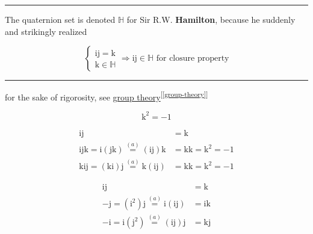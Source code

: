 \documentclass[
]{book}
\theoremstyle{definition}
\theoremstyle{definition}
\theoremstyle{definition}
\theoremstyle{definition}
\theoremstyle{remark}
\begin{document}
\begin{center}\rule{0.5\linewidth}{0.5pt}\end{center}

The quaternion set is denoted \(\mathbb{H}\) for Sir R.W. \textbf{Hamilton}, because he suddenly and strikingly realized

\[
\begin{cases}
\mathrm{i}\mathrm{j}=\mathrm{k}\\
\mathrm{k}\in\mathbb{H}
\end{cases}\Rightarrow\mathrm{i}\mathrm{j}\in\mathbb{H}\text{ for closure property}
\]

\begin{center}\rule{0.5\linewidth}{0.5pt}\end{center}

for the sake of rigorosity, see \hyperref[group-theory]{group theory}\textsuperscript{{[}\ref{group-theory}{]}}

\[
\mathrm{k}^{2}=-1
\]

\[
\begin{aligned}
\mathrm{i}\mathrm{j} & =\mathrm{k}\\
\mathrm{i}\mathrm{j}\mathrm{k}=\mathrm{i}\left(\mathrm{j}\mathrm{k}\right)\overset{\left(a\right)}{=}\left(\mathrm{i}\mathrm{j}\right)\mathrm{k} & =\mathrm{k}\mathrm{k}=\mathrm{k}^{2}=-1\\
\mathrm{k}\mathrm{i}\mathrm{j}=\left(\mathrm{k}\mathrm{i}\right)\mathrm{j}\overset{\left(a\right)}{=}\mathrm{k}\left(\mathrm{i}\mathrm{j}\right) & =\mathrm{k}\mathrm{k}=\mathrm{k}^{2}=-1
\end{aligned}
\]

\[
\begin{aligned}
\mathrm{i}\mathrm{j} & =\mathrm{k}\\
-\mathrm{j}=\left(\mathrm{i}^{2}\right)\mathrm{j}\overset{\left(a\right)}{=}\mathrm{i}\left(\mathrm{i}\mathrm{j}\right) & =\mathrm{i}\mathrm{k}\\
-\mathrm{i}=\mathrm{i}\left(\mathrm{j}^{2}\right)\overset{\left(a\right)}{=}\left(\mathrm{i}\mathrm{j}\right)\mathrm{j} & =\mathrm{k}\mathrm{j}
\end{aligned}
\]
\end{document}
